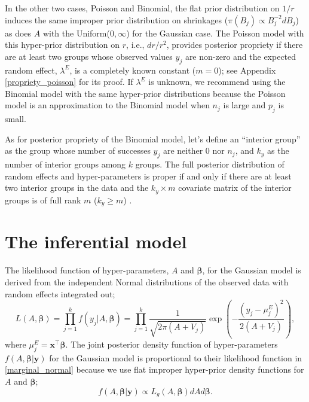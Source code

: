 \documentclass[article]{jss}
\begin{document}
In the other two cases, Poisson and Binomial, the flat prior distribution on $1/r$ induces the same improper prior distribution on shrinkages ($\pi(B_{j})\propto B_{j}^{-2} d B_j$) as does $A$ with the Uniform($0, \infty$) for the Gaussian case. The Poisson model with this hyper-prior distribution on $r$, i.e., $dr/r^2$,  provides posterior propriety if there are at least two groups whose observed values $y_j$ are non-zero  and the expected random effect, $\lambda^E$, is a completely known constant ($m=0$); see Appendix \ref{propriety_poisson} for its proof. If $\lambda^E$ is unknown,  we recommend using the Binomial model with the same hyper-prior distributions because the Poisson model is  an approximation to the Binomial model when $n_j$ is large and $p_j$ is small.

As for posterior propriety of the Binomial model, let's define an ``interior group'' as the group whose number of successes $y_j$ are neither 0 nor $n_j$, and $k_y$ as the number of interior groups among $k$ groups. The full posterior distribution of random effects and hyper-parameters is proper if and only if there are at least two interior groups in the data and the $k_y\times m$ covariate matrix of the interior groups is of full rank $m$ ($k_y\ge m$) \citep{tak2016propriety}. 



\section[Inference]{The inferential model}\label{inference}

The likelihood function of hyper-parameters, $A$ and $\boldsymbol{\beta}$, for the Gaussian  model is derived from the independent Normal distributions of the observed data with random effects integrated out; %
\begin{equation}\label{marginal_normal}
L(A, \boldsymbol{\boldsymbol{\beta}})=\prod_{j=1}^k f(y_j\vert A, \boldsymbol{\boldsymbol{\beta}})=\prod_{j=1}^k \frac{1}{\sqrt{2\pi (A+V_j)}}\exp\left(-\frac{(y_j-\mu^E_j)^2}{2(A+V_j)}\right),
\end{equation}
where $\mu^E_j=\boldsymbol{x}^\top\boldsymbol{\beta}$. The joint posterior density  function of hyper-parameters $f(A, \boldsymbol{\boldsymbol{\beta}}\vert \boldsymbol{y})$ for the Gaussian  model is proportional to their likelihood function in  \eqref{marginal_normal} because we use flat improper hyper-prior density functions for $A$ and $\boldsymbol{\beta}$;
\begin{equation}\label{marginal_post_normal}
f(A, \boldsymbol{\boldsymbol{\beta}}\vert \boldsymbol{y})\propto L_g(A, \boldsymbol{\boldsymbol{\beta}})dAd\boldsymbol{\beta}.
\end{equation}
\end{document}
